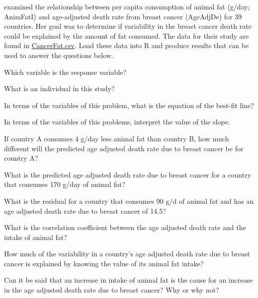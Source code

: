 \documentclass[10pt,openany]{book}\usepackage[]{graphicx}\usepackage[]{color}
\begin{document}
\begin{exsection}
  \item \label{revex:RegFat} \rhw{} \cite{Carroll1975} examined the relationship between per capita consumption of animal fat (g/day; AnimFatI) and age-adjusted death rate from breast cancer (AgeAdjDe) for 39 countries.  Her goal was to determine if variability in the breast cancer death rate could be explained by the amount of fat consumed.  The data for their study are found in \href{https://raw.githubusercontent.com/droglenc/NCData/master/CancerFat.csv}{CancerFat.csv}.  Load these data into R and produce results that can be used to answer the questions below. 
    \begin{Enumerate}
      \item Which variable is the response variable?
      \item What is an individual in this study?
      \item In terms of the variables of this problem, what is the equation of the best-fit line?
      \item In terms of the variables of this problems, interpret the value of the slope.
      \item If country A consumes 4 g/day less animal fat than country B, how much different will the predicted age adjusted death rate due to breast cancer be for country A?
      \item What is the predicted age adjusted death rate due to breast cancer for a country that consumes 170 g/day of animal fat?
      \item What is the residual for a country that consumes 90 g/d of animal fat and has an age adjusted death rate due to breast cancer of 14.5?
      \item What is the correlation coefficient between the age adjusted death rate and the intake of animal fat?
      \item How much of the variability in a country's age adjusted death rate due to breast cancer is explained by knowing the value of its animal fat intake?
      \item Can it be said that an increase in intake of animal fat is the cause for an increase in the age adjusted death rate due to breast cancer? Why or why not?
    \end{Enumerate}


\end{exsection}
\end{document}
